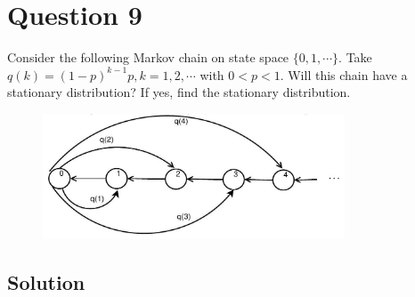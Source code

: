 \section*{Question 9}

Consider the following Markov chain on state space \( \{ 0,1, \cdots \} \).
Take \( q(k)={(1-p)}^{k-1} p, k=1,2, \cdots \) with \( 0<p<1 \).
Will this chain have a stationary distribution?
If yes, find the stationary distribution.

\begin{figure}[h]
    \centering
    \includegraphics[width=0.8\textwidth]{figures/images/q9.jpg}
\end{figure}

\subsection*{Solution}
